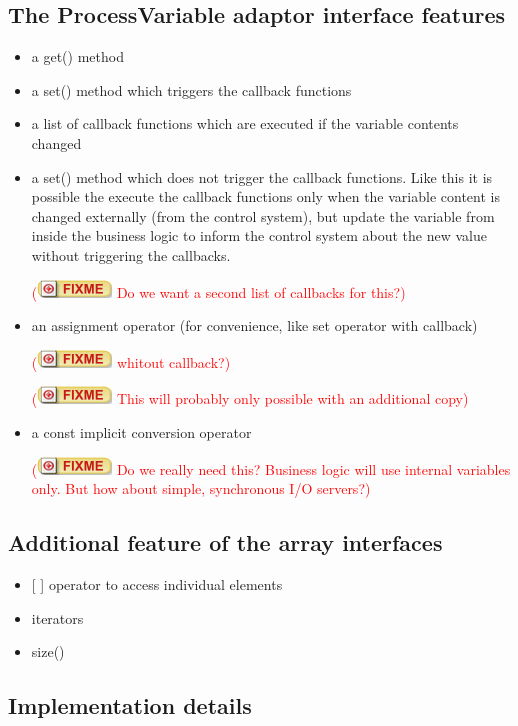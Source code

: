 \documentclass[11pt,a4paper]{scrartcl}
\newcounter{nFixmes}
\newcommand{\fixme}[1]{\addtocounter{nFixmes}{1}\textcolor{red}{(\includegraphics[height=2ex]{fixme} #1)}\xspace}
\begin{document}
\subsection{The ProcessVariable adaptor interface features}
\begin{itemize}
\item a get() method
\item a set() method which triggers the callback functions
\item a list of callback functions which are executed if the variable contents changed
\item a set() method which does not trigger the callback functions. Like this it is possible the execute the callback functions only when the variable content is changed externally (from the control system), but update the variable from inside the business logic to inform the control system about the new value without triggering the callbacks.
  \fixme{Do we want a second list of callbacks for this?}
\item an assignment operator (for convenience, like set operator with callback) \fixme{whitout callback?} \fixme{This will probably only possible with an additional copy}
\item a const implicit conversion operator \fixme{Do we really need this? Business logic will use internal variables only. But how about simple, synchronous I/O servers?}
\end{itemize}

\subsection{Additional feature of the array interfaces}

\begin{itemize}
\item {[ ]} operator to access individual elements
\item iterators
\item size()
\end{itemize}

\subsection{Implementation details}
\end{document}
